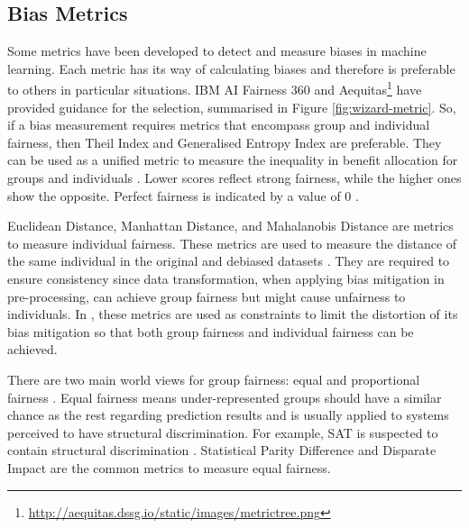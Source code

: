 \documentclass[sigconf]{acmart}
\begin{document}
	\subsection{Bias Metrics}
	\label{sec:bias_metrics}	
	Some metrics have been developed to detect and measure biases in machine learning. Each metric has its way of calculating biases and therefore is preferable to others in particular situations. IBM AI Fairness 360 \cite{mahoney2020ai,ibmaif3602022guidance} and Aequitas\footnote{\url{http://aequitas.dssg.io/static/images/metrictree.png}} have provided guidance for the selection, summarised in Figure \ref{fig:wizard-metric}. So, if a bias measurement requires metrics that encompass group and individual fairness, then Theil Index \cite{conceicao2000theyoung,bellamy2018ai} and Generalised Entropy Index \cite{speicher2018unified} are preferable. They can be used as a unified metric to measure the inequality in benefit allocation for groups and individuals \cite{ibmaif3602022guidance,mahoney2020ai}. Lower scores reflect strong fairness, while the higher ones show the opposite. Perfect fairness is indicated by a value of 0 \cite{lale2022doc}. 
	
	Euclidean Distance, Manhattan Distance, and Mahalanobis Distance are metrics to measure individual fairness. These metrics are used to measure the distance of the same individual in the original and debiased datasets \cite{bellamy2018ai}. They are required to ensure consistency since data transformation, when applying bias mitigation in pre-processing, can achieve group fairness but might cause unfairness to individuals. In \cite{calmon2017optimized},   these metrics are used as constraints to limit the distortion of its bias mitigation so that both group fairness and individual fairness can be achieved. 
	
	There are two main world views for group fairness: equal and proportional fairness \cite{mahoney2020ai,ibmaif3602022guidance}. Equal fairness means under-represented groups should have a similar chance as the rest regarding prediction results and is usually applied to systems perceived to have structural discrimination. For example, SAT is suspected to contain structural discrimination \cite{mahoney2020ai,ibmaif3602022guidance}. Statistical Parity Difference \cite{dwork2012fairness,mahoney2020ai,ibmaif3602022guidance} and Disparate Impact \cite{feldman2015disparate,mahoney2020ai,ibmaif3602022guidance} are the common metrics to measure equal fairness. 
	
\end{document}
